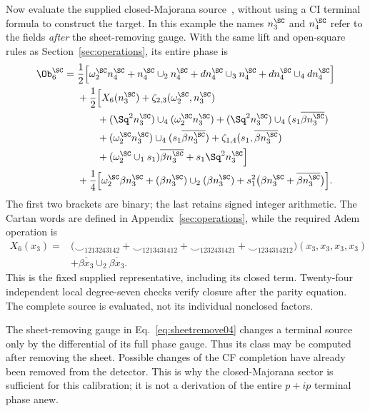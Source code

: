 Now evaluate the supplied closed-Majorana source~\cite[Sec.~V~G]{Project4}, without using a CI terminal formula to construct the target. In this example the names $n_3^{\SC}$ and $n_4^{\SC}$ refer to the fields \emph{after} the sheet-removing gauge. With the same lift and open-square rules as Section~\ref{sec:operations}, its entire phase is
\begin{align}\label{eq:closedparityeval04}
\Ob_6^{\SC}={}&\frac12\Big[
 \omega_2^{\SC}n_4^{\SC}+n_4^{\SC}\cup_2n_4^{\SC}
 +dn_4^{\SC}\cup_3n_4^{\SC}+dn_4^{\SC}\cup_4dn_4^{\SC}\Big]\nonumber\\
&+\frac12\Big[X_6(n_3^{\SC})+\zeta_{2,3}(\omega_2^{\SC},n_3^{\SC})\nonumber\\
&\qquad +(\Sq^2n_3^{\SC})\cup_4(\omega_2^{\SC}n_3^{\SC})
 +(\Sq^2n_3^{\SC})\cup_4(s_1\overline{\beta n_3^{\SC}})\nonumber\\
&\qquad +(\omega_2^{\SC}n_3^{\SC})\cup_4(s_1\overline{\beta n_3^{\SC}})
 +\zeta_{1,4}(s_1,\overline{\beta n_3^{\SC}})\nonumber\\
&\qquad +(\omega_2^{\SC}\cup_1s_1)\overline{\beta n_3^{\SC}}
 +s_1\Sq^2n_3^{\SC}\Big]\nonumber\\
&+\frac14\Big[\omega_2^{\SC}\beta n_3^{\SC}
 +(\beta n_3^{\SC})\cup_2(\beta n_3^{\SC})
 +s_1^2\big(\beta n_3^{\SC}+\overline{\beta n_3^{\SC}}\big)\Big].
\end{align}
The first two brackets are binary; the last retains signed integer arithmetic. The Cartan words are defined in Appendix~\ref{sec:operations}, while the required Adem operation is
\begin{equation}\label{eq:X6-parity}
\begin{split}
X_6(x_3)={}&
 \big(\smile_{1213243142}+\smile_{1213431412}
      +\smile_{1232431421}+\smile_{1234314212}\big)(x_3,x_3,x_3,x_3)\\
 &+\overline{\beta x_3}\cup_2\overline{\beta x_3}.
\end{split}
\end{equation}
This is the fixed supplied representative, including its closed term. Twenty-four independent local degree-seven checks verify closure after the parity equation. The complete source is evaluated, not its individual nonclosed factors.

The sheet-removing gauge in Eq.~\eqref{eq:sheetremove04} changes a terminal source only by the differential of its full phase gauge. Thus its class may be computed after removing the sheet. Possible changes of the CF completion have already been removed from the detector. This is why the closed-Majorana sector is sufficient for this calibration; it is not a derivation of the entire $p+ip$ terminal phase anew.


